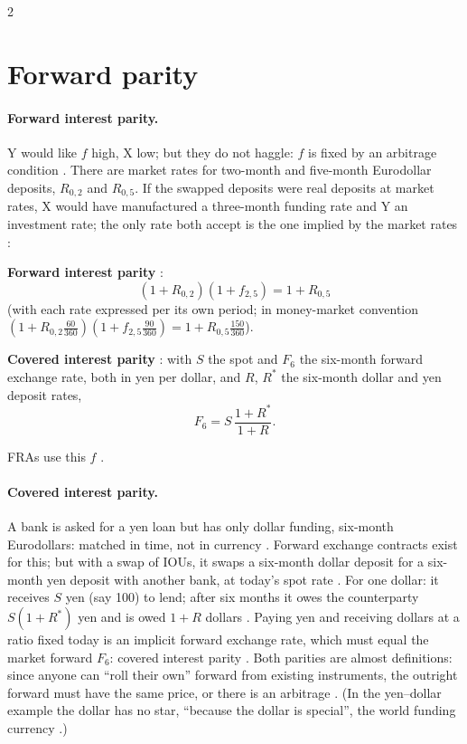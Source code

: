 \begin{paracol}{2}
\section{Forward parity}\label{sec:ed-parity}

\paragraph{Forward interest parity.} Y would like $f$ high, X low; but they do not haggle: $f$ is fixed by an arbitrage condition . There are market rates
for two-month and five-month Eurodollar deposits, $R_{0,2}$ and $R_{0,5}$. If the swapped deposits were real deposits at market rates, X would have manufactured a three-month funding
rate and Y an investment rate; the only rate both accept is the one implied by the market rates :
\begin{keyformulas}
\textbf{Forward interest parity} :
\[
  (1+R_{0,2})(1+f_{2,5}) = 1+R_{0,5}
\]
(with each rate expressed per its own period; in money-market convention $(1+R_{0,2}\tfrac{60}{360})(1+f_{2,5}\tfrac{90}{360}) = 1+R_{0,5}\tfrac{150}{360}$).

\medskip
\textbf{Covered interest parity} : with $S$ the spot and $F_6$ the six-month forward exchange rate, both in yen per dollar, and $R$, $R^\ast$ the six-month
dollar and yen deposit rates,
\[
  F_6 = S\,\frac{1+R^\ast}{1+R}.
\]
\end{keyformulas}
FRAs use this $f$ .

\paragraph{Covered interest parity.} A bank is asked for a yen loan but has only dollar funding, six-month Eurodollars: matched in time, not in currency .
Forward exchange contracts exist for this; but with a swap of IOUs, it swaps a six-month dollar deposit for a six-month yen deposit with another bank, at today's spot rate
. For one dollar: it receives $S$ yen (say 100) to lend; after six months it owes the counterparty $S(1+R^\ast)$ yen and is owed
$1+R$ dollars . Paying yen and receiving dollars at a ratio fixed today is an implicit forward exchange rate, which must equal the
market forward $F_6$: covered interest parity . Both parities are almost definitions: since anyone can ``roll their own'' forward from existing instruments, the outright
forward must have the same price, or there is an arbitrage . (In the yen--dollar example the dollar has no star, ``because the dollar is special'', the world funding
currency .)


\end{paracol}
